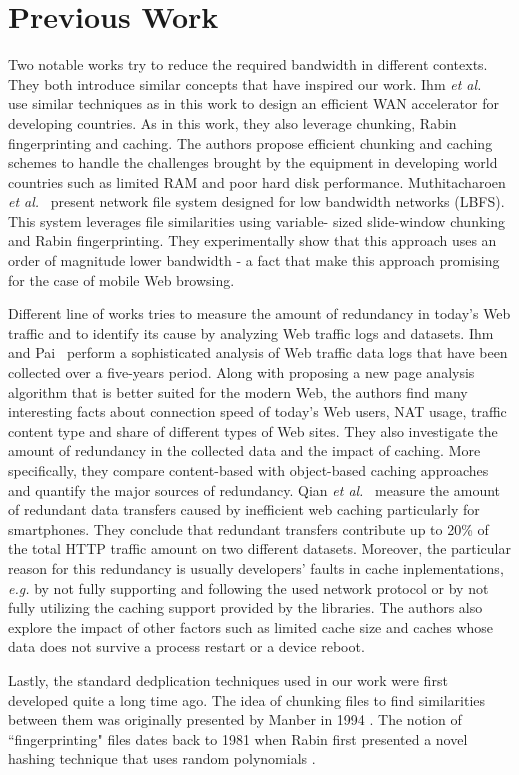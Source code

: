 \section{Previous Work}\label{sec:rel_work}
Two notable works try to reduce the required bandwidth in different contexts. They both introduce similar concepts that have
inspired our work. Ihm \textit{et al.}~\cite{wanax} use similar techniques as in this work to design an efficient WAN accelerator for developing countries. As in this work, they also leverage chunking, Rabin fingerprinting and caching. 
The authors propose efficient chunking and caching schemes to handle the challenges brought by the equipment in developing world countries such as limited RAM and poor hard disk performance. Muthitacharoen \textit{et al.}~\cite{lbfs} present 
network file system designed for low bandwidth networks (LBFS). This system leverages file similarities using variable-
sized slide-window chunking and Rabin fingerprinting. They experimentally show that this approach uses an order of
magnitude lower bandwidth - a fact that make this approach promising for the case of mobile Web browsing.

Different line of works tries to measure the amount of redundancy in today's Web traffic and to identify its cause by
analyzing Web traffic logs and datasets. Ihm and Pai~\cite{modern_web_traffic} perform a sophisticated analysis of Web traffic data logs that have been collected over a five-years period. Along with proposing a new page analysis algorithm 
that is better suited for the modern Web, the authors find many interesting facts about connection speed of today's Web users, NAT usage, traffic content type and share of different types of Web sites. They also investigate the amount of redundancy in the collected data and the impact of caching. More specifically, they compare content-based with object-based caching approaches and quantify the major sources of redundancy. Qian \textit{et al.}~\cite{web_caching} measure the 
amount of redundant data transfers caused by inefficient web caching particularly for smartphones. They conclude that redundant transfers contribute up to 20\% of the total HTTP traffic amount on two different datasets. Moreover, the particular reason for this redundancy is usually developers' faults in cache inplementations, \textit{e.g.} by not fully supporting and following the used network protocol or by not fully utilizing the caching support provided by the libraries. The authors also explore the impact of other factors such as limited cache size and caches whose data does not survive a process restart or a device reboot.

Lastly, the standard dedplication techniques used in our work were first developed quite a long time ago. The idea of chunking files to find 
similarities between them was originally presented by Manber in 1994 \cite{manber}. The notion of ``fingerprinting" 
files dates back to 1981 when Rabin first presented a novel hashing technique that uses random polynomials \cite{rabin}.
